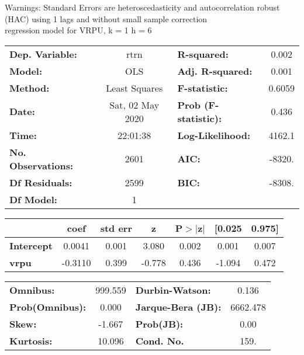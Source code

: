Warnings: \newline
 [1] Standard Errors are heteroscedasticity and autocorrelation robust (HAC) using 1 lags and without small sample correction\\ 

regression model for VRPU, k = 1 h = 6\begin{center}
\begin{tabular}{lclc}
\toprule
\textbf{Dep. Variable:}    &       rtrn       & \textbf{  R-squared:         } &     0.002   \\
\textbf{Model:}            &       OLS        & \textbf{  Adj. R-squared:    } &     0.001   \\
\textbf{Method:}           &  Least Squares   & \textbf{  F-statistic:       } &    0.6059   \\
\textbf{Date:}             & Sat, 02 May 2020 & \textbf{  Prob (F-statistic):} &    0.436    \\
\textbf{Time:}             &     22:01:38     & \textbf{  Log-Likelihood:    } &    4162.1   \\
\textbf{No. Observations:} &        2601      & \textbf{  AIC:               } &    -8320.   \\
\textbf{Df Residuals:}     &        2599      & \textbf{  BIC:               } &    -8308.   \\
\textbf{Df Model:}         &           1      & \textbf{                     } &             \\
\bottomrule
\end{tabular}
\begin{tabular}{lcccccc}
                   & \textbf{coef} & \textbf{std err} & \textbf{z} & \textbf{P$> |$z$|$} & \textbf{[0.025} & \textbf{0.975]}  \\
\midrule
\textbf{Intercept} &       0.0041  &        0.001     &     3.080  &         0.002        &        0.001    &        0.007     \\
\textbf{vrpu}      &      -0.3110  &        0.399     &    -0.778  &         0.436        &       -1.094    &        0.472     \\
\bottomrule
\end{tabular}
\begin{tabular}{lclc}
\textbf{Omnibus:}       & 999.559 & \textbf{  Durbin-Watson:     } &    0.136  \\
\textbf{Prob(Omnibus):} &   0.000 & \textbf{  Jarque-Bera (JB):  } & 6662.478  \\
\textbf{Skew:}          &  -1.667 & \textbf{  Prob(JB):          } &     0.00  \\
\textbf{Kurtosis:}      &  10.096 & \textbf{  Cond. No.          } &     159.  \\
\bottomrule
\end{tabular}
\end{center}

